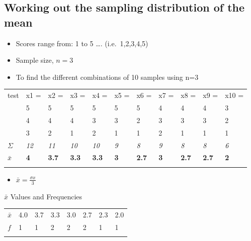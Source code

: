 \documentclass[]{article}
\begin{document}
\subsection{Working out the sampling distribution of the
mean}\label{working-out-the-sampling-distribution-of-the-mean}

\begin{itemize}
\itemsep1pt\parskip0pt
\item
  Scores range from: 1 to 5 \ldots{}. (i.e.~1,2,3,4,5)
\item
  Sample size, $n = 3$
\item
  To find the different combinations of 10 samples using n=3
\end{itemize}

\begin{longtable}[c]{@{}lllllllllll@{}}
\toprule\addlinespace
test & x1 = & x2 = & x3 = & x4 = & x5 = & x6 = & x7 = & x8 = & x9 = &
x10 =
\\\addlinespace
\midrule\endhead
1 & 5 & 5 & 5 & 5 & 5 & 5 & 4 & 4 & 4 & 3
\\\addlinespace
2 & 4 & 4 & 4 & 3 & 3 & 2 & 3 & 3 & 3 & 2
\\\addlinespace
3 & 3 & 2 & 1 & 2 & 1 & 1 & 2 & 1 & 1 & 1
\\\addlinespace
$\Sigma$ & \emph{12} & \emph{11} & \emph{10} & \emph{10} & \emph{9} &
\emph{8} & \emph{9} & \emph{8} & \emph{8} & \emph{6}
\\\addlinespace
$\bar{x}$ & \textbf{4} & \textbf{3.7} & \textbf{3.3} & \textbf{3.3} &
\textbf{3} & \textbf{2.7} & \textbf{3} & \textbf{2.7} & \textbf{2.7} &
\textbf{2}
\\\addlinespace
\bottomrule
\end{longtable}

\begin{itemize}
\itemsep1pt\parskip0pt
\item
  $\bar{x}=\frac{\sigma x}{3}$
\end{itemize}

$\bar{x}$ Values and Frequencies

\begin{longtable}[c]{@{}llllllll@{}}
\toprule\addlinespace
$\bar{x}$ & 4.0 & 3.7 & 3.3 & 3.0 & 2.7 & 2.3 & 2.0
\\\addlinespace
\midrule\endhead
$f$ & 1 & 1 & 2 & 2 & 2 & 1 & 1
\\\addlinespace
\bottomrule
\end{longtable}
\end{document}
